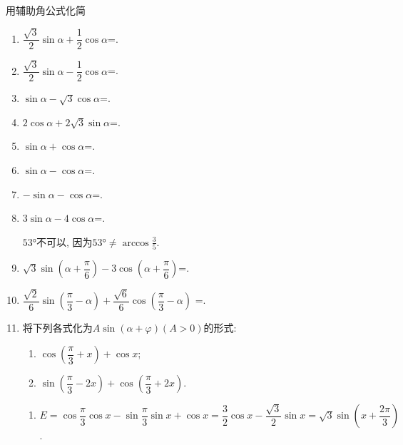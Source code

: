 用辅助角公式化简
\begin{enumerate}
\item $\dfrac{\sqrt{3}}{2}\sin\alpha+\dfrac{1}{2}\cos\alpha$=. 

\item $\dfrac{\sqrt{3}}{2}\sin\alpha-\dfrac{1}{2}\cos\alpha$=. 

\item $\sin\alpha-\sqrt{3}\cos\alpha$=. 

\item $2\cos\alpha+2\sqrt{3}\sin\alpha$=. 

\item $\sin\alpha+\cos\alpha$=. 

\item $\sin\alpha-\cos\alpha$=. 

\item $-\sin\alpha-\cos\alpha$=. 

\item $3\sin\alpha-4\cos\alpha$=. 
\begin{jieda}
$\ang{53}$不可以, 因为$\ang{53}\neq\arccos\frac{3}{5}$. 
\end{jieda}

\item $\sqrt{3}\sin\left(\alpha+\dfrac{\pi}{6}\right)-3\cos\left(\alpha+\dfrac{\pi}{6}\right)$=. 

\item $\dfrac{\sqrt{2}}{6}\sin\left(\dfrac{\pi}{3}-\alpha\right)+\dfrac{\sqrt{6}}{6}\cos\left(\dfrac{\pi}{3}-\alpha\right)$
=. 


\item 将下列各式化为$A\sin(\alpha+\varphi)(A>0)$的形式: 
\begin{enumerate}[(1)]
\item $\cos\left(\dfrac{\pi}{3}+x\right)+\cos{x}$; 

\item $\sin\left(\dfrac{\pi}{3}-2x\right)+\cos\left(\dfrac{\pi}{3}+2x\right)$. 
\end{enumerate}
\begin{jieda}
\begin{enumerate}[(1)]
\item $E=\cos\dfrac{\pi}{3}\cos{x}-\sin\dfrac{\pi}{3}\sin{x}+\cos{x}=\dfrac{3}{2}\cos{x}-\dfrac{\sqrt{3}}{2}\sin{x}=\sqrt{3}\sin\left(x+\dfrac{2\pi}{3}\right)$. 


\end{enumerate}
\end{jieda}
\end{enumerate}
